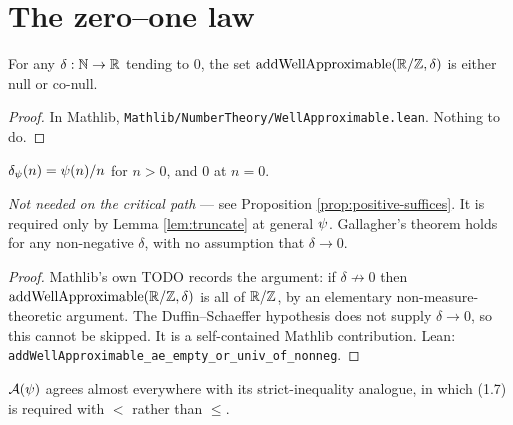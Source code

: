 \chapter{The zero--one law}
\label{chap:gallagher}

\begin{theorem}
  \label{thm:gallagher}
  \leanok
  \mathlibok
  For any $\delta : \mathbb{N} \to \mathbb{R}$ tending to $0$, the set
  $\mathrm{addWellApproximable}(\mathbb{R}/\mathbb{Z}, \delta)$ is either null or co-null.
\end{theorem}

\begin{proof}
  \leanok
  In Mathlib, \texttt{Mathlib/NumberTheory/WellApproximable.lean}. Nothing to do.
\end{proof}

\begin{definition}
  \label{def:distseq}
  \leanok
  $\delta_\psi(n) = \psi(n)/n$ for $n > 0$, and $0$ at $n = 0$.
\end{definition}

\begin{lemma}
  \label{lem:gallagher-no-tendsto}
  \notready
  \emph{Not needed on the critical path} --- see Proposition
  \ref{prop:positive-suffices}. It is required only by Lemma \ref{lem:truncate} at
  general $\psi$.
  Gallagher's theorem holds for any non-negative $\delta$, with no assumption that
  $\delta \to 0$.
\end{lemma}

\begin{proof}
  Mathlib's own TODO records the argument: if $\delta \not\to 0$ then
  $\mathrm{addWellApproximable}(\mathbb{R}/\mathbb{Z},\delta)$ is all of $\mathbb{R}/\mathbb{Z}$, by an elementary
  non-measure-theoretic argument. The Duffin--Schaeffer hypothesis does not supply
  $\delta \to 0$, so this cannot be skipped. It is a self-contained Mathlib
  contribution. Lean: \texttt{addWellApproximable\_ae\_empty\_or\_univ\_of\_nonneg}.
\end{proof}

\begin{lemma}
  \label{lem:strict}
  \leanok
  $\mathcal{A}(\psi)$ agrees almost everywhere with its strict-inequality analogue, in which (1.7)
  is required with $<$ rather than $\leq$.
\end{lemma}

